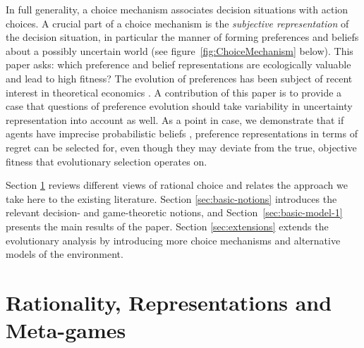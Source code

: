 \documentclass[fleqn,reqno,12pt]{article}
\theoremstyle{Satz}
\theoremstyle{Bsp}
\begin{document}
In full generality, a choice mechanism associates decision situations with action choices. A crucial
part of a choice mechanism is the \emph{subjective representation} of the decision situation,
in particular the manner of forming preferences and beliefs about a possibly uncertain world (see
figure~\ref{fig:ChoiceMechanism} below). This paper asks: which preference and belief
representations are ecologically valuable and lead to high fitness?
The evolution of
preferences has been subject of recent interest in theoretical economics
\citep[e.g.,][]{algweib13,DekElyYlan07,RobSam11}. A contribution of this paper is
to provide a case that questions of preference evolution should take
variability in uncertainty representation into account as well. As a point in case, we demonstrate
that if agents have imprecise probabilistic beliefs \citep[e.g.][]{gardsah82,levi74,walley96},
preference representations in terms of regret can be selected for, even though they may deviate
from the true, objective fitness that evolutionary selection operates on.


Section \ref{sec:rati--subj} reviews different views of rational choice and relates the
approach we take here to the existing literature. Section \ref{sec:basic-notions} introduces the
relevant decision- and game-theoretic notions, and
Section~\ref{sec:basic-model-1} presents the
main results of the paper. Section \ref{sec:extensions} extends the evolutionary analysis by
introducing more choice mechanisms and alternative models of the environment.


\section{Rationality, Representations and Meta-games}
\label{sec:rati--subj}
\end{document}
